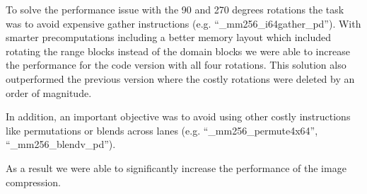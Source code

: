 To solve the performance issue with the 90 and 270 degrees rotations the task
was to avoid expensive gather instructions (e.g. ``\_mm256\_i64gather\_pd'').
With smarter precomputations including a better memory layout which included
rotating the range blocks instead of the domain blocks we were able to increase
the performance for the code version with all four rotations. This solution also
outperformed the previous version where the costly rotations were deleted by an
order of magnitude.

In addition, an important objective was to avoid using other costly instructions
like permutations or blends across lanes (e.g. ``\_mm256\_permute4x64'',
``_mm256_blendv_pd'').

As a result we were able to significantly increase the performance of the image
compression.



